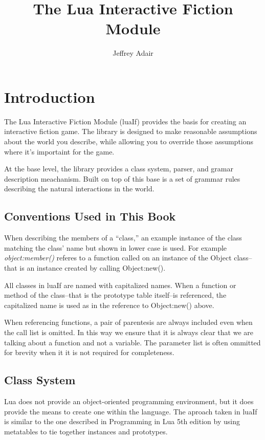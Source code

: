 \documentclass{book}
\title{The Lua Interactive Fiction Module}
\author{Jeffrey Adair}
\begin{document}
\maketitle

\chapter{Introduction}

The Lua Interactive Fiction Module (luaIf) provides the basis for
creating an interactive fiction game. The library is designed to make
reasonable assumptions about the world you describe, while allowing
you to override those assumptions where it's importaint for the game.

At the base level, the library provides a class system, parser, and
gramar description meachanism. Built on top of this base is a set of
grammar rules describing the natural interactions in the world.

\section{Conventions Used in This Book}

When describing the members of a ``class,'' an example instance of the
class matching the class' name but shown in lower case is used. For
example \emph{object:member()} referes to a function called on an
instance of the Object class--that is an instance created by calling
Object:new().

All classes in luaIf are named with capitalized names. When a function
or method of the class--that is the prototype table itself--is
referenced, the capitalized name is used as in the reference to
Object:new() above.

When referencing functions, a pair of parentesis are always included
even when the call list is omitted. In this way we ensure that it is
always clear that we are talking about a function and not a
variable. The parameter list is often ommitted for brevity when it it
is not required for completeness.

\section{Class System}

Lua does not provide an object-oriented programming environment, but
it does provide the means to create one within the language. The
aproach taken in luaIf is similar to the one described in Programming
in Lua 5th edition by using metatables to tie together instances and
prototypes.
\end{document}
